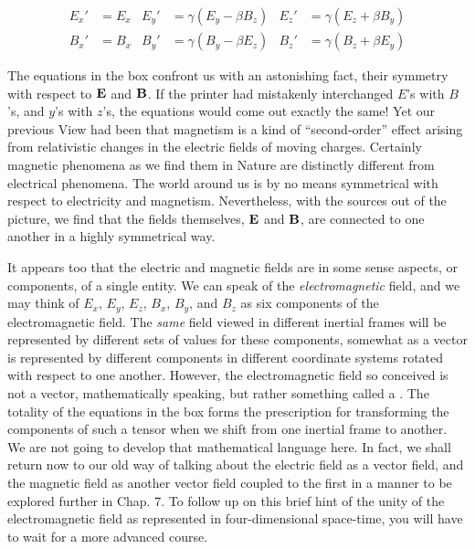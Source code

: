 \begin{framed}
\begin{align}
  E_x'&=E_x    &    E_y'&=\gamma(E_y-\beta B_z)   &    E_z'&=\gamma(E_z+\beta B_y) \\
  B_x'&=B_x    &    B_y'&=\gamma(B_y-\beta E_z)   &    B_z'&=\gamma(B_z+\beta E_y) 
\end{align}
\end{framed}

The equations in the box confront us with an astonishing fact, their
symmetry with respect to $\mathbf{E}$ and $\mathbf{B}$. If the printer had mistakenly
interchanged $E$'s with $B$'s, and $y$'s with $z$'s, the equations would come
out exactly the same! Yet our previous View had been that magnetism
is a kind of ``second-order'' effect arising from relativistic
changes in the electric fields of moving charges. Certainly magnetic
phenomena as we find them in Nature are distinctly different from
electrical phenomena. The world around us is by no means symmetrical
with respect to electricity and magnetism. Nevertheless,
with the sources out of the picture, we find that the fields themselves,
$\mathbf{E}$ and $\mathbf{B}$, are connected to one another in a highly symmetrical way.

It appears too that the electric and magnetic fields are in some
sense aspects, or components, of a single entity. We can speak of the
\emph{electromagnetic} field,
and we may think of $E_x$, $E_y$, $E_z$, $B_x$, $B_y$, and $B_z$ as
six components of the electromagnetic field. The \emph{same} field viewed
in different inertial frames will be represented by different sets of
values for these components, somewhat as a vector is represented by
different components in different coordinate systems rotated with
respect to one another. However, the electromagnetic field so
conceived is not a vector, mathematically speaking, but rather
something called a . The totality of the equations in the box
forms the prescription for transforming the components of such a
tensor when we shift from one inertial frame to another. We are not
going to develop that mathematical language here. In fact, we shall
return now to our old way of talking about the electric field as a vector
field, and the magnetic field as another vector field coupled to the
first in a manner to be explored further in Chap. 7. To follow up on
this brief hint of the unity of the electromagnetic field as represented
in four-dimensional space-time, you will have to wait for a more
advanced course.

